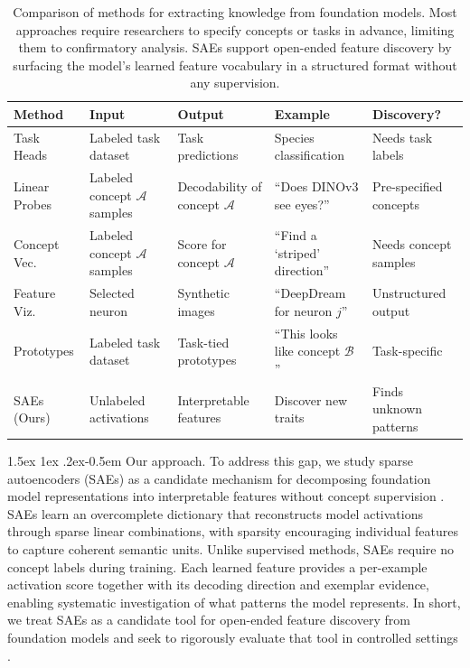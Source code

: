 \documentclass{article}
\makeatletter
\renewcommand{\paragraph}{%
  \@startsection{paragraph}{4}%
  {\z@}{1.5ex \@plus 1ex \@minus .2ex}{-0.5em}%
  {\normalfont\normalsize\bfseries}%
}
\newcommand{\cmark}{\textcolor{green}{\ding{51}}}
\newcommand{\xmark}{\textcolor{red}{\ding{55}}}
\theoremstyle{plain}
\theoremstyle{definition}
\theoremstyle{remark}
\makeatother
\begin{document}
\begin{table}[t]
    \centering
    \small
    \renewcommand{\arraystretch}{1.2}
    \setlength{\tabcolsep}{4pt}
    \caption{Comparison of methods for extracting knowledge from foundation models. Most approaches require researchers to specify concepts or tasks in advance, limiting them to confirmatory analysis. 
    SAEs support open-ended feature discovery by surfacing the model's learned feature vocabulary in a structured format without any supervision.
    }
    \label{tab:related-work}
    \begin{tabular}{lllll}
    \toprule
    \textbf{Method} & \textbf{Input} & \textbf{Output} & \textbf{Example} & \textbf{Discovery?} \\
    \midrule
    Task Heads & Labeled task dataset & Task predictions & Species classification & \xmark{} Needs task labels \\
    Linear Probes & Labeled concept $\mathcal{A}$ samples & Decodability of concept $\mathcal{A}$ & ``Does DINOv3 see eyes?'' & \xmark{} Pre-specified concepts \\
    Concept Vec. & Labeled concept $\mathcal{A}$ samples & Score for concept $\mathcal{A}$ & ``Find a `striped' direction'' & \xmark{} Needs concept samples \\
    Feature Viz. & Selected neuron & Synthetic images & ``DeepDream for neuron $j$'' & \xmark{} Unstructured output \\
    Prototypes & Labeled task dataset & Task-tied prototypes & ``This looks like concept $\mathcal{B}$'' & \xmark{} Task-specific \\
    SAEs (Ours) & Unlabeled activations & Interpretable features & Discover new traits & \cmark{} Finds unknown patterns \\
    \bottomrule
    \end{tabular}
\end{table}

\paragraph{Our approach.}
To address this gap, we study sparse autoencoders (SAEs) as a candidate mechanism for decomposing foundation model representations into interpretable features without concept supervision \citep{bricken2023monosemanticity,templeton2024scaling,cunningham2023sparse,gao2025scaling}.
SAEs learn an overcomplete dictionary that reconstructs model activations through sparse linear combinations, with sparsity encouraging individual features to capture coherent semantic units.
Unlike supervised methods, SAEs require no concept labels during training.
Each learned feature provides a per-example activation score together with its decoding direction and exemplar evidence, enabling systematic investigation of what patterns the model represents.
In short, we treat SAEs as a candidate tool for open-ended feature discovery from foundation models and seek to rigorously evaluate that tool in controlled settings \citep{peng2025unknown}.
\end{document}
